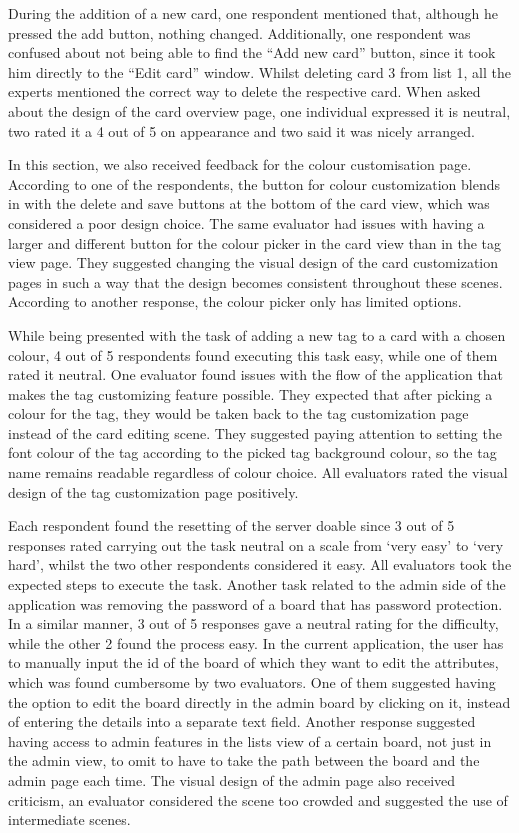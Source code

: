 During the addition of a new card, one respondent mentioned that, although he pressed the add button, nothing changed. Additionally, one respondent was confused about not being able to find the “Add new card” button, since it took him directly to the  “Edit card” window. Whilst deleting card 3 from list 1, all the experts mentioned the correct way to delete the respective card. When asked about the design of the card overview page, one individual expressed it is neutral, two rated it a 4 out of 5 on appearance and two said it was nicely arranged.

In this section, we also received feedback for the colour customisation page. According to one of the respondents, the button for colour customization blends in with the delete and save buttons at the bottom of the card view, which was considered a poor design choice. The same evaluator had issues with having a larger and different button for the colour picker in the card view than in the tag view page. They suggested changing the visual design of the card customization pages in such a way that the design becomes consistent throughout these scenes. According to another response, the colour picker only has limited options. 

While being presented with the task of adding a new tag to a card with a chosen colour, 4 out of 5 respondents found executing this task easy, while one of them rated it neutral. One evaluator found issues with the flow of the application that makes the tag customizing feature possible. They expected that after picking a colour for the tag, they would be taken back to the tag customization page instead of the card editing scene. They suggested paying attention to setting the font colour of the tag according to the picked tag background colour, so the tag name remains readable regardless of colour choice. All evaluators rated the visual design of the tag customization page positively.

Each respondent found the resetting of the server doable since 3 out of 5 responses rated carrying out the task neutral on a scale from ‘very easy’ to ‘very hard’, whilst the two other respondents considered it easy. All evaluators took the expected steps to execute the task. Another task related to the admin side of the application was removing the password of a board that has password protection. In a similar manner, 3 out of 5 responses gave a neutral rating for the difficulty, while the other 2 found the process easy. In the current application, the user has to manually input the id of the board of which they want to edit the attributes, which was found cumbersome by two evaluators. One of them suggested having the option to edit the board directly in the admin board by clicking on it, instead of entering the details into a separate text field. Another response suggested having access to admin features in the lists view of a certain board, not just in the admin view, to omit to have to take the path between the board and the admin page each time. The visual design of the admin page also received criticism, an evaluator considered the scene too crowded and suggested the use of intermediate scenes.
